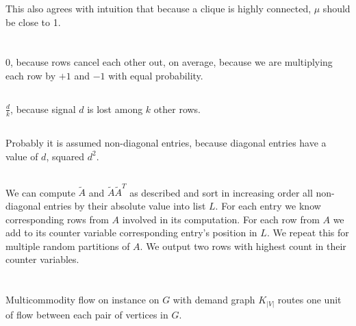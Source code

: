 \documentclass[a4paper,11pt,oneside,onecolumn]{article}
\begin{document}
This also agrees with intuition that because a clique is highly connected, $\mu$ should be close to 1.

\section{}

\subsection{}

$0$, because rows cancel each other out, on average, because we are multiplying each row by $+1$ and $-1$ with equal probability.

\subsection{}

$\frac{d}{k}$, because signal $d$ is lost among $k$ other rows.

\subsection{}

Probably it is assumed non-diagonal entries, because diagonal entries have a value of $d$, squared $d^2$.

\subsection{}

\subsection{}

We can compute $\tilde A$ and $\tilde A \tilde A^T$ as described and sort in increasing order all non-diagonal entries by their absolute value into list $L$. For each entry we know corresponding rows from $A$ involved in its computation. For each row from $A$ we add to its counter variable corresponding entry's position in $L$. We repeat this for multiple random partitions of $A$. We output two rows with
highest count in their counter variables.

\section{}

Multicommodity flow on instance on $G$ with demand graph $K_{|V|}$ routes one unit of flow between each pair of vertices in $G$.
\end{document}
